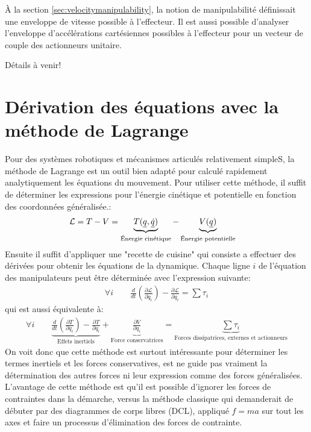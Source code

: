 À la section \ref{sec:velocitymanipulability}, la notion de manipulabilité définissait une enveloppe de vitesse possible à l'effecteur. Il est aussi possible d'analyser l'enveloppe d'accélérations cartésiennes possibles à l'effecteur pour un vecteur de couple des actionneurs unitaire. 

Détails à venir!



\newpage
\section{Dérivation des équations avec la méthode de Lagrange}
\label{sec:lagrange}

Pour des systèmes robotiques et mécanismes articulés relativement simpleS, la méthode de Lagrange est un outil bien adapté pour calculé rapidement analytiquement les équations du mouvement. Pour utiliser cette méthode, il suffit de déterminer les expressions pour l'énergie cinétique et potentielle en fonction des coordonnées généralisée.:
\begin{align}
\mathcal{L} &= T - V = 
\underbrace{T(\underline{q},\underline{\dot{q}})}_{\text{Énergie cinétique}}
- 
\underbrace{V(\underline{q})}_{\text{Énergie potentielle}}
\end{align}
Ensuite il suffit d'appliquer une "recette de cuisine" qui consiste a effectuer des dérivées pour obtenir les équations de la dynamique. Chaque ligne $i$ de l'équation des manipulateurs peut être déterminée avec l'expression suivante:
\begin{align}
\forall i \quad \quad \frac{d}{dt}\left(\frac{\partial \mathcal{L}}{\partial \dot{q}_i}\right) - \frac{\partial \mathcal{L}}{\partial q_i} = \sum \tau_i
\end{align}
qui est aussi équivalente à:
\begin{align}
\forall i \quad \quad 
\underbrace{
\frac{d}{dt}(\frac{\partial T}{\partial \dot{q}_i}) 
- 
\frac{\partial T}{\partial q_i} 
}_{\text{Effets inertiels}}
+
\underbrace{
\frac{\partial V}{\partial q_i} 
}_{\text{Force conservatrices}}
= 
\underbrace{
\sum \tau_i
}_{\text{Forces dissipatrices, externes et actionneurs}}
\end{align}
On voit donc que cette méthode est surtout intéressante pour déterminer les termes inertiels et les forces conservatives, est ne guide pas vraiment la détermination des autres forces ni leur expression comme des forces généralisées. L'avantage de cette méthode est qu'il est possible d'ignorer les forces de contraintes dans la démarche, versus la méthode classique qui demanderait de débuter par des diagrammes de corps libres (DCL), appliqué $f=ma$ sur tout les axes et faire un processus d'élimination des forces de contrainte. 

